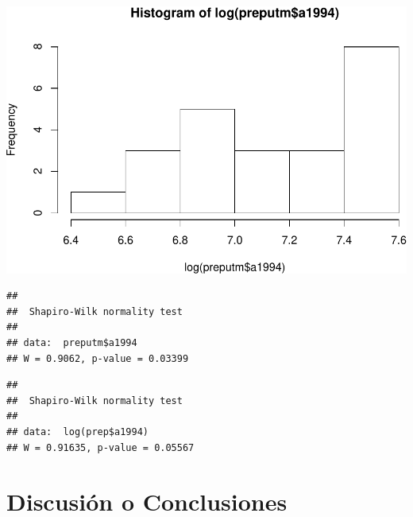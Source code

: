 \documentclass[11pt,]{article}
\newenvironment{Shaded}{\begin{snugshade}}{\end{snugshade}}
\newcommand{\KeywordTok}[1]{\textcolor[rgb]{0.13,0.29,0.53}{\textbf{#1}}}
\newcommand{\OperatorTok}[1]{\textcolor[rgb]{0.81,0.36,0.00}{\textbf{#1}}}
\newcommand{\NormalTok}[1]{#1}
\begin{document}
\begin{Shaded}
\end{Shaded}

\includegraphics{proyecto_files/figure-latex/unnamed-chunk-3-2.pdf}

\begin{Shaded}
\end{Shaded}

\begin{verbatim}
## 
##  Shapiro-Wilk normality test
## 
## data:  preputm$a1994
## W = 0.9062, p-value = 0.03399
\end{verbatim}

\begin{Shaded}
\end{Shaded}

\begin{verbatim}
## 
##  Shapiro-Wilk normality test
## 
## data:  log(prep$a1994)
## W = 0.91635, p-value = 0.05567
\end{verbatim}

\section{Discusión o Conclusiones}\label{discusiuxf3n-o-conclusiones}
\end{document}
